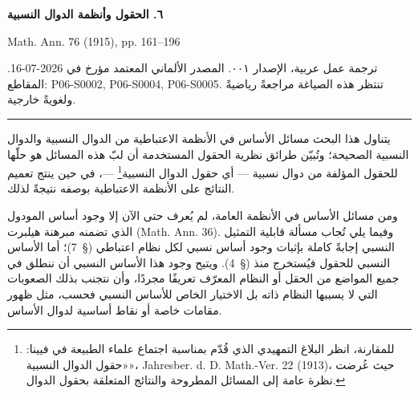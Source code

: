 \documentclass[12pt]{article}
\begin{document}
\begin{center}
  {\Large\bfseries ٦. الحقول وأنظمة الدوال النسبية\par}
  \vspace{0.8em}
  \textenglish{Math. Ann. 76 (1915), pp. 161--196}
\end{center}

\vspace{0.5em}
{\footnotesize\noindent
ترجمة عمل عربية، الإصدار ٠٠١. المصدر الألماني المعتمد مؤرخ في
\textenglish{2026-07-16}. المقاطع:
\textenglish{P06-S0002, P06-S0004, P06-S0005}.
تنتظر هذه الصياغة مراجعةً رياضيةً ولغويةً خارجية.\par}
\vspace{0.5em}
\hrule
\vspace{1.2em}

يتناول هذا البحث مسائل الأساس في الأنظمة الاعتباطية من الدوال النسبية
والدوال النسبية الصحيحة؛ وتُبيّن طرائق نظرية الحقول المستخدمة أن لبّ هذه
المسائل هو حلّها للحقول المؤلفة من دوال نسبية --- أي حقول الدوال
النسبية\footnote{للمقارنة، انظر البلاغ التمهيدي الذي قُدّم بمناسبة اجتماع
علماء الطبيعة في فيينا: «حقول الدوال النسبية»،
\textenglish{Jahresber. d. D. Math.-Ver. 22 (1913)}، حيث عُرضت نظرة عامة
إلى المسائل المطروحة والنتائج المتعلقة بحقول الدوال.} ---، في حين ينتج
تعميم النتائج على الأنظمة الاعتباطية بوصفه نتيجةً لذلك.

ومن مسائل الأساس في الأنظمة العامة، لم يُعرف حتى الآن إلا وجود أساس
المودول الذي تضمنه مبرهنة هيلبرت (\textenglish{Math. Ann. 36}). وفيما يلي
تُجاب مسألة قابلية التمثيل النسبي إجابةً كاملة بإثبات وجود أساس نسبي لكل
نظام اعتباطي (\textenglish{\S~7})؛ أما الأساس النسبي للحقول فيُستخرج منذ
(\textenglish{\S~4}). ويتيح وجود هذا الأساس النسبي أن ننطلق في جميع
المواضع من الحقل أو النظام المعرّف تعريفًا مجردًا، وأن نتجنب بذلك الصعوبات
التي لا يسببها النظام ذاته بل الاختيار الخاص للأساس النسبي فحسب، مثل ظهور
مقامات خاصة أو نقاط أساسية لدوال الأساس.
\end{document}
